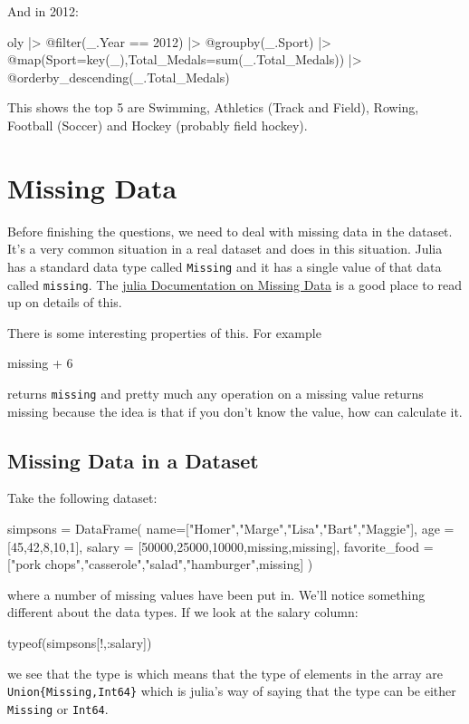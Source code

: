 And in 2012:
%
\begin{jlblock}[data]
oly |>
  @filter(_.Year == 2012) |>
  @groupby(_.Sport) |>
  @map({Sport=key(_),Total_Medals=sum(_.Total_Medals)}) |>
  @orderby_descending(_.Total_Medals)
\end{jlblock}

This shows the top 5 are Swimming, Athletics (Track and Field), Rowing,
Football (Soccer) and Hockey (probably field hockey).


\section{Missing Data}

Before finishing the questions, we need to deal with missing data in the dataset.  It's a very common situation in a real dataset and does in this situation.  Julia has a standard data type called \texttt{Missing} and it has a single value of that data called \texttt{missing}. The \href{https://docs.julialang.org/en/latest/manual/missing/}{julia Documentation on Missing Data} is a good place to read up on details of this.

There is some interesting properties of this. For example
%
\begin{jlblock}[data]
missing + 6
\end{jlblock}

returns \texttt{missing} and pretty much any operation on a missing
value returns missing because the idea is that if you don't know the
value, how can calculate it.

\subsection{Missing Data in a Dataset}

Take the following dataset:
%
\begin{jlblock}[data]
simpsons = DataFrame(
  name=["Homer","Marge","Lisa","Bart","Maggie"],
  age =[45,42,8,10,1],
  salary = [50000,25000,10000,missing,missing],
  favorite_food = ["pork chops","casserole","salad","hamburger",missing]
)
\end{jlblock}
%
where a number of missing values have been put in. We'll notice
something different about the data types. If we look at the salary
column:

\begin{jlblock}[data]
typeof(simpsons[!,:salary])
\end{jlblock}

we see that the type is  \printpythontex[verb] which means that the type of elements in the array are \texttt{Union\{Missing,Int64\}} which is julia's way of saying that the type can be either \texttt{Missing} or \texttt{Int64}.

